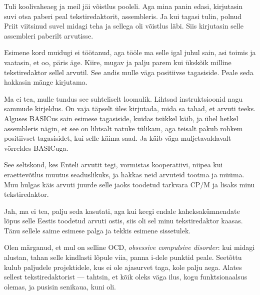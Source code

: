 Tuli koolivaheaeg ja meil jäi võistlus pooleli. Aga mina panin edasi, kirjutasin suvi 
otsa paberi peal tekstiredaktorit, assembleris. Ja kui tagasi tulin, 
polnud Priit viitsinud suvel midagi teha ja sellega oli võistlus 
läbi. Siis kirjutasin selle assembleri paberilt arvutisse.


Esimene kord muidugi ei töötanud, aga tööle ma selle igal juhul sain, asi 
toimis ja vaatasin, et oo, päris äge. Kiire, mugav ja 
palju parem kui ükskõik milline tekstiredaktor sellel arvutil. See andis mulle 
väga positiivse tagasiside. Peale seda hakkasin mänge kirjutama.


Ma ei tea, mulle tundus see suhteliselt loomulik. Lihtsad instruktsioonid nagu sammude kirjeldus. On 
vaja täpselt üles kirjutada, mida sa tahad, et arvuti teeks. Alguses BASICus sain esimese 
tagasiside, kuidas tsükkel käib, ja ühel hetkel assembleris nägin, et see on 
lihtsalt natuke tülikam, aga teisalt pakub rohkem positiivset tagasisidet, kui selle käima saad. Ja käib väga muljetavaldavalt võrreldes 
BASICuga. 


See seltskond, kes Enteli arvutit tegi, 
vormistas kooperatiivi, niipea kui eraettevõtlus muutus seaduslikuks, ja 
hakkas neid arvuteid tootma ja müüma. Muu hulgas käis arvuti juurde 
selle jaoks toodetud tarkvara CP/M ja lisaks minu tekstiredaktor.


Jah, ma ei tea, palju seda kasutati, aga kui keegi endale kaheksakümnendate lõpus 
selle Eestis toodetud arvuti ostis, siis oli sel minu tekstiredaktor kaasas. 
Tänu sellele saime esimese palga ja tekkis esimene 
sissetulek.


Olen märganud, et mul on selline 
OCD, \emph{obsessive compulsive disorder}: kui midagi alustan, tahan selle 
kindlasti lõpule viia, panna i-dele punktid peale. Seetõttu kulub paljudele 
projektidele, kus ei ole ajasurvet taga, kole palju aega. Alates sellest 
tekstiredaktorist --- tahtsin, et kõik oleks väga ilus, kogu funktsionaalsus 
olemas, ja pusisin senikaua, kuni oli. 

